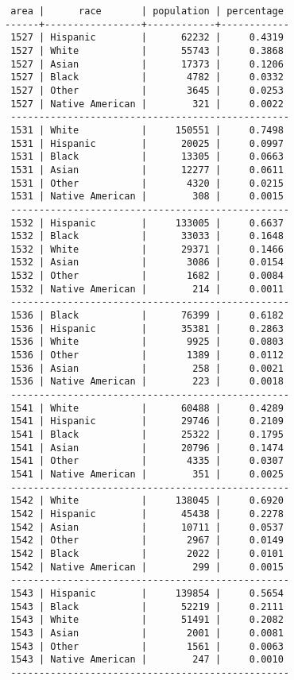 \documentclass[10pt]{article}
\begin{document}
\begin{verbatim}
 area |      race       | population | percentage
------+-----------------+------------+------------
 1527 | Hispanic        |      62232 |     0.4319
 1527 | White           |      55743 |     0.3868
 1527 | Asian           |      17373 |     0.1206
 1527 | Black           |       4782 |     0.0332
 1527 | Other           |       3645 |     0.0253
 1527 | Native American |        321 |     0.0022
 -------------------------------------------------
 1531 | White           |     150551 |     0.7498
 1531 | Hispanic        |      20025 |     0.0997
 1531 | Black           |      13305 |     0.0663
 1531 | Asian           |      12277 |     0.0611
 1531 | Other           |       4320 |     0.0215
 1531 | Native American |        308 |     0.0015
 -------------------------------------------------
 1532 | Hispanic        |     133005 |     0.6637
 1532 | Black           |      33033 |     0.1648
 1532 | White           |      29371 |     0.1466
 1532 | Asian           |       3086 |     0.0154
 1532 | Other           |       1682 |     0.0084
 1532 | Native American |        214 |     0.0011
 -------------------------------------------------
 1536 | Black           |      76399 |     0.6182
 1536 | Hispanic        |      35381 |     0.2863
 1536 | White           |       9925 |     0.0803
 1536 | Other           |       1389 |     0.0112
 1536 | Asian           |        258 |     0.0021
 1536 | Native American |        223 |     0.0018
 -------------------------------------------------
 1541 | White           |      60488 |     0.4289
 1541 | Hispanic        |      29746 |     0.2109
 1541 | Black           |      25322 |     0.1795
 1541 | Asian           |      20796 |     0.1474
 1541 | Other           |       4335 |     0.0307
 1541 | Native American |        351 |     0.0025
 -------------------------------------------------
 1542 | White           |     138045 |     0.6920
 1542 | Hispanic        |      45438 |     0.2278
 1542 | Asian           |      10711 |     0.0537
 1542 | Other           |       2967 |     0.0149
 1542 | Black           |       2022 |     0.0101
 1542 | Native American |        299 |     0.0015
 -------------------------------------------------
 1543 | Hispanic        |     139854 |     0.5654
 1543 | Black           |      52219 |     0.2111
 1543 | White           |      51491 |     0.2082
 1543 | Asian           |       2001 |     0.0081
 1543 | Other           |       1561 |     0.0063
 1543 | Native American |        247 |     0.0010
 -------------------------------------------------

\end{verbatim}
\end{document}
